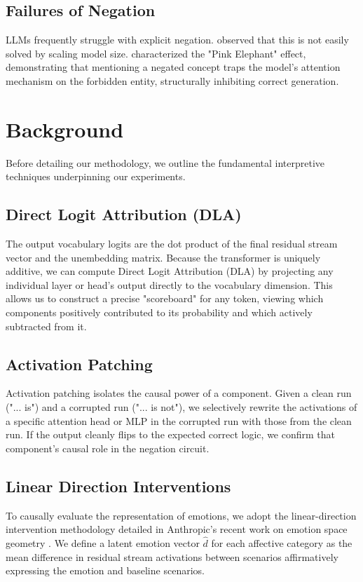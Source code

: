 \documentclass[11pt]{article}
\begin{document}
\subsection{Failures of Negation}
LLMs frequently struggle with explicit negation. \citet{truong2023} observed that this is not easily solved by scaling model size. \citet{vrabcova2024} characterized the "Pink Elephant" effect, demonstrating that mentioning a negated concept traps the model's attention mechanism on the forbidden entity, structurally inhibiting correct generation.

\section{Background}
\label{sec:arch}
Before detailing our methodology, we outline the fundamental interpretive techniques underpinning our experiments.

\subsection{Direct Logit Attribution (DLA)}
The output vocabulary logits are the dot product of the final residual stream vector and the unembedding matrix. Because the transformer is uniquely additive, we can compute Direct Logit Attribution (DLA) by projecting any individual layer or head's output directly to the vocabulary dimension. This allows us to construct a precise "scoreboard" for any token, viewing which components positively contributed to its probability and which actively subtracted from it.

\subsection{Activation Patching}
Activation patching isolates the causal power of a component. Given a clean run ("... is") and a corrupted run ("... is not"), we selectively rewrite the activations of a specific attention head or MLP in the corrupted run with those from the clean run. If the output cleanly flips to the expected correct logic, we confirm that component's causal role in the negation circuit.

\subsection{Linear Direction Interventions}
To causally evaluate the representation of emotions, we adopt the linear-direction intervention methodology detailed in Anthropic's recent work on emotion space geometry \citep{emotions2026}. We define a latent emotion vector $\hat{d}$ for each affective category as the mean difference in residual stream activations between scenarios affirmatively expressing the emotion and baseline scenarios.
\end{document}
